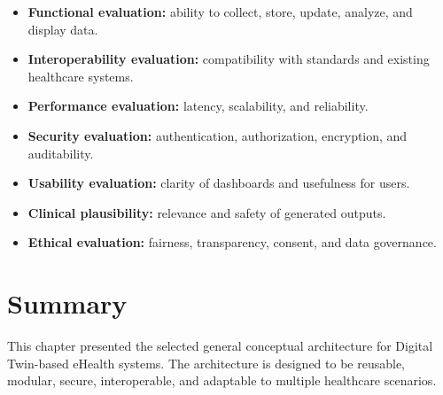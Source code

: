 \begin{itemize}[leftmargin=*]
    \item \textbf{Functional evaluation:} ability to collect, store, update, analyze, and display data.
    \item \textbf{Interoperability evaluation:} compatibility with standards and existing healthcare systems.
    \item \textbf{Performance evaluation:} latency, scalability, and reliability.
    \item \textbf{Security evaluation:} authentication, authorization, encryption, and auditability.
    \item \textbf{Usability evaluation:} clarity of dashboards and usefulness for users.
    \item \textbf{Clinical plausibility:} relevance and safety of generated outputs.
    \item \textbf{Ethical evaluation:} fairness, transparency, consent, and data governance.
\end{itemize}

\section{Summary}
This chapter presented the selected general conceptual architecture for Digital Twin-based eHealth systems. The architecture is designed to be reusable, modular, secure, interoperable, and adaptable to multiple healthcare scenarios.

\clearpage

